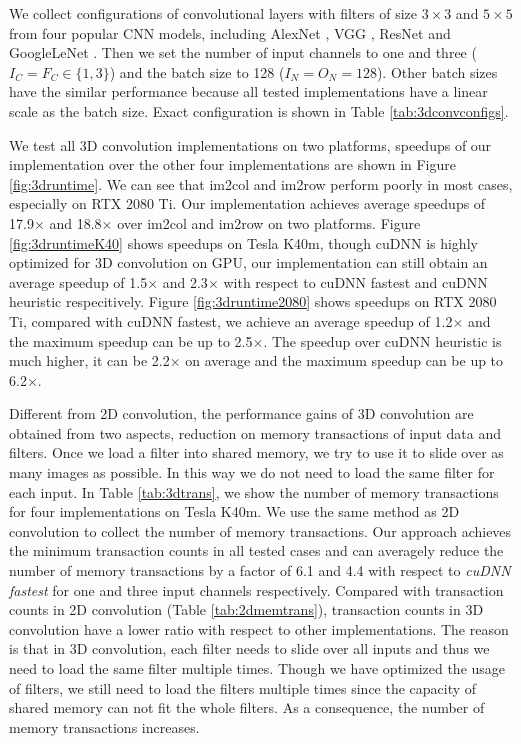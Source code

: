 \documentclass[sigplan,review,anonymous]{acmart}\settopmatter{printfolios=true,printccs=false,printacmref=false}
\begin{document}
We collect configurations of convolutional layers with filters of size $3 \times 3$ and $5 \times 5$ from four popular CNN models, including AlexNet \cite{Krizhevsky2012ImageNet}, VGG \cite{SimonyanZ14a}, ResNet \cite{HeZRS16} and GoogleLeNet \cite{SzegedyLJSRAEVR15}. Then we set the number of input channels to one and three ($I_C=F_C \in \{1, 3\}$) and the batch size to 128 ($I_N=O_N=128$). Other batch sizes have the similar performance because all tested implementations have a linear scale as the batch size. Exact configuration is shown in Table \ref{tab:3dconvconfigs}.

We test all 3D convolution implementations on two platforms, speedups of our implementation over the other four implementations are shown in Figure \ref{fig:3druntime}. We can see that im2col and im2row perform poorly in most cases, especially on RTX 2080 Ti. Our implementation achieves average speedups of 17.9$\times$ and 18.8$\times$ over im2col and im2row on two platforms. Figure \ref{fig:3druntimeK40} shows speedups on Tesla K40m, though cuDNN is highly optimized for 3D convolution on GPU, our implementation can still obtain an average speedup of 1.5$\times$ and 2.3$\times$ with respect to cuDNN fastest and cuDNN heuristic respecitively. Figure \ref{fig:3druntime2080} shows speedups on RTX 2080 Ti, compared with cuDNN fastest, we achieve an average speedup of 1.2$\times$ and the maximum speedup can be up to 2.5$\times$. The speedup over cuDNN heuristic is much higher, it can be 2.2$\times$ on average and the maximum speedup can be up to 6.2$\times$.

Different from 2D convolution, the performance gains of 3D convolution are obtained from two aspects, reduction on memory transactions of input data and filters. Once we load a filter into shared memory, we try to use it to slide over as many images as possible. In this way we do not need to load the same filter for each input. In Table \ref{tab:3dtrans}, we show the number of memory transactions for four implementations on Tesla K40m. We use the same method as 2D convolution to collect the number of memory transactions. Our approach achieves the minimum transaction counts in all tested cases and can averagely reduce the number of memory transactions by a factor of 6.1 and 4.4 with respect to \emph{cuDNN fastest} for one and three input channels respectively. Compared with transaction counts in 2D convolution (Table \ref{tab:2dmemtrans}), transaction counts in 3D convolution have a lower ratio with respect to other implementations. The reason is that in 3D convolution, each filter needs to slide over all inputs and thus we need to load the same filter multiple times. Though we have optimized the usage of filters, we still need to load the filters multiple times since the capacity of shared memory can not fit the whole filters. As a consequence, the number of memory transactions increases.
\end{document}
